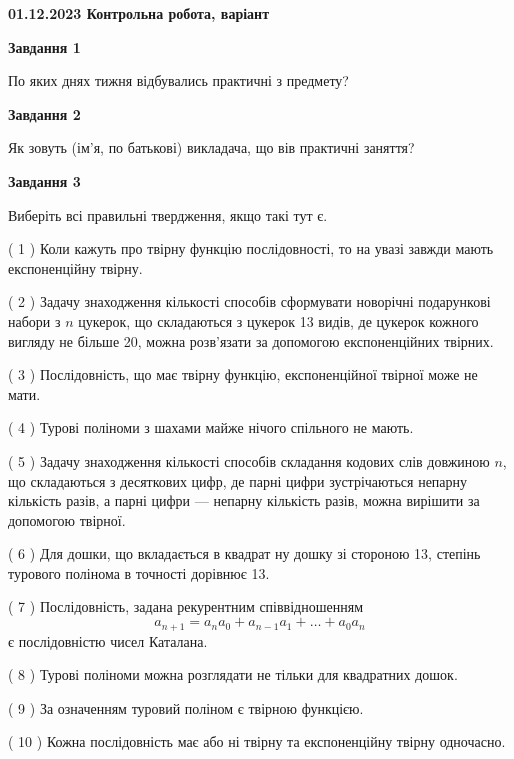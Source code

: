 \documentclass[12pt, ukrainian]{article}
\begin{document}
\begin {large}

\textbf{01.12.2023 Контрольна робота, варіант  }\par


{
{\begin {center}\textbf{Завдання 1}\end {center}}\par
По яких днях тижня відбувались практичні з предмету?\par
{\begin {center}\textbf{Завдання 2}\end {center}}\par
Як зовуть (ім'я, по батькові) викладача, що вів практичні заняття?\par
{\begin {center}\textbf{Завдання 3}\end {center}}\par
Виберіть всі правильні твердження, якщо такі тут є.\par
\vspace{2mm}
( 1 ) Коли кажуть про твірну функцію послідовності, то на увазі завжди мають експоненційну твірну.%

( 2 ) Задачу знаходження кількості способів сформувати новорічні подарункові набори з $n$ цукерок, що складаються з цукерок 13 видів, де цукерок кожного вигляду не більше 20, можна розв’язати за допомогою експоненційних твірних.%

( 3 ) Послідовність, що має твірну функцію, експоненційної твірної може не мати.%

( 4 ) Турові поліноми з шахами майже нічого спільного не мають.%

( 5 ) Задачу знаходження кількості способів складання кодових слів довжиною $n$, що складаються з десяткових цифр, де парні цифри зустрічаються непарну кількість разів, а парні цифри — непарну кількість разів, можна вирішити за допомогою твірної.%

( 6 ) Для дошки, що вкладається в квадрат ну дошку зі стороною 13, степінь турового полінома в точності дорівнює 13.%

( 7 ) Послідовність, задана рекурентним співвідношенням $$a_{n+1}=a_{n}a_{0}+a_{n-1}a_{1}+\ldots+a_0a_{n}$$ є послідовністю чисел Каталана.%

( 8 ) Турові поліноми можна розглядати не тільки для квадратних дошок.%

( 9 ) За означенням туровий поліном є твірною функцією.%

( 10 ) Кожна послідовність має або ні твірну та експоненційну твірну одночасно.%
}
\end {large}

\vspace{4mm}
\newpage
\end{document}
